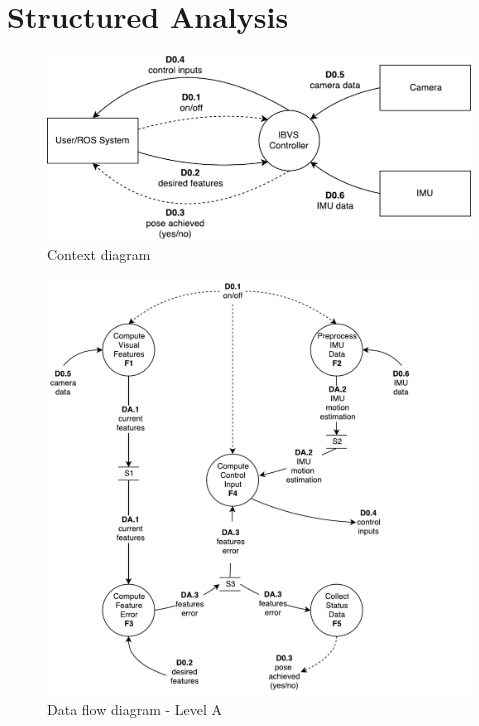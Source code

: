 
\section{Structured Analysis}
\label{sec:sa}

\begin{figure}[h]
	\centering
	\includegraphics[width=\textwidth]{content/chapter_03/images/sa_diagram_01.pdf}
	\caption{Context diagram}
	\label{fig:sa_diag_01}
\end{figure}

\begin{figure}[h]
	\centering
	\includegraphics[width=\textwidth]{content/chapter_03/images/sa_diagram_02.pdf}
	\caption{Data flow diagram - Level A}
	\label{fig:sa_diag_01}
\end{figure}


